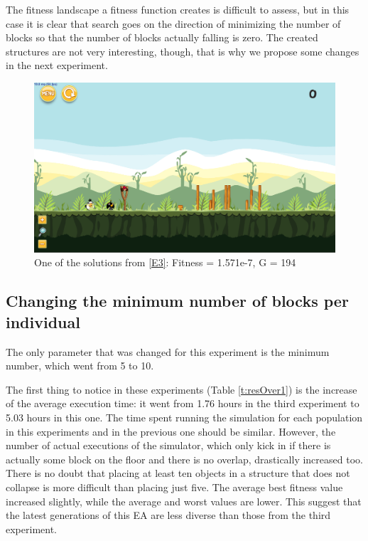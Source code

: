 \documentclass[sigconf]{acmart}
\begin{document}
The fitness landscape a fitness function creates is difficult to
assess, but in this case it is clear that search goes on the direction
of minimizing the number of blocks so that the number of blocks
actually falling is zero. The created structures are not very
interesting, though, that is why we propose some changes in the next experiment.
\begin{figure}
	\centering
	\includegraphics[scale=0.2]{level-0-second_crossover180613_055622.png}
	\caption{One of the solutions from \ref{E3}: Fitness = 1.571e-7, G = 194  
	}\label{f:e3-4}
\end{figure}
\subsection{Changing the minimum number of blocks per individual}\label{E4}

The only parameter that was changed for this experiment is the minimum
number, which went from 5 to 10. 

The first thing to notice in these experiments (Table \ref{t:resOver1}) is the 
increase of the average execution time: it went from 1.76 hours in the third 
experiment to 5.03 hours in this one. The time spent running the simulation for 
each population in this experiments and in the previous one should be similar. 
However, the number of actual executions of the simulator, which only
kick in if there is actually some block on the floor and there is no overlap, 
drastically increased too. There is no doubt 
that placing at least ten objects in a structure that does not
collapse is more difficult than placing just five. The average 
best fitness value increased slightly, while the average and worst values are 
lower. This suggest that the latest generations of this EA are less diverse 
than those 
from the third experiment.
\end{document}
